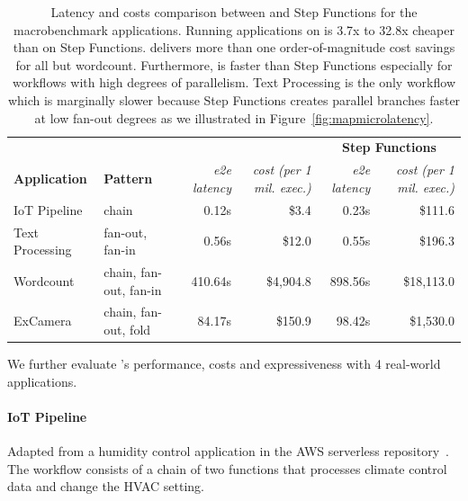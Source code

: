 \begin{table}[t]
\centering
\begin{tabular}{ll|rr|rr}
\hline
                     &                        & \multicolumn{2}{c}{\textbf{\name{}}}            & \multicolumn{2}{c}{\textbf{Step Functions}}       \\
\textbf{Application} & \textbf{Pattern}       & \textit{e2e latency} & \textit{cost (per 1 mil. exec.)}   & \textit{e2e latency} & \textit{cost (per 1 mil. exec.)}            \\ \hline
IoT Pipeline         & chain                  & 0.12s              & \$3.4      & 0.23s       & \$111.6    \\
Text Processing      & fan-out, fan-in        & 0.56s             & \$12.0      & 0.55s        & \$196.3   \\
Wordcount            & chain, fan-out, fan-in & 410.64s                 & \$4,904.8   & 898.56s                 & \$18,113.0 \\
ExCamera             & chain, fan-out, fold   & 84.17s                  & \$150.9 & 98.42s                  & \$1,530.0      \\ \hline
\end{tabular}
\caption{Latency and costs comparison between \name{} and Step Functions for
the macrobenchmark applications. Running applications on \name{} is 3.7x to
32.8x cheaper than on Step Functions. \name{} delivers more than one
order-of-magnitude cost savings for all but wordcount. Furthermore, \name{} is
faster than Step Functions especially for workflows with high degrees of
parallelism. Text Processing is the only workflow which \name{} is marginally
slower because Step Functions creates parallel branches faster at low fan-out
degrees as we illustrated in Figure~\ref{fig:mapmicrolatency}. 
}
\label{table:macro}
\end{table}

We further evaluate \name{}'s performance, costs and expressiveness with 4
real-world applications. 

\paragraph{IoT Pipeline} Adapted from a humidity control application in the
AWS serverless repository~\cite{iot-pipeline}. The workflow consists of a
chain of two functions that processes climate control data and change the HVAC
setting.

